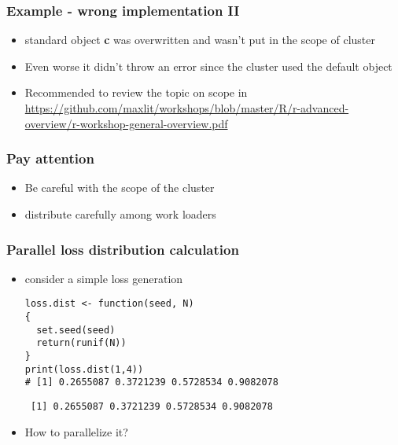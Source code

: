 \documentclass[bigger]{beamer}
\begin{document}
\begin{frame}
\frametitle{Example - wrong implementation II}
\label{sec-3-11}
\begin{itemize}

\item standard object \textbf{c} was overwritten and wasn't put in the scope of cluster
\label{sec-3-11-1}%

\item Even worse it didn't throw an error since the cluster used the default object
\label{sec-3-11-2}%

\item Recommended to review the topic on scope in\\
\label{sec-3-11-3}%
\href{https://github.com/maxlit/workshops/blob/master/R/r-advanced-overview/r-workshop-general-overview.pdf}{https://github.com/maxlit/workshops/blob/master/R/r-advanced-overview/r-workshop-general-overview.pdf}
\end{itemize} %
\end{frame}
\begin{frame}
\frametitle{Pay attention}
\label{sec-3-12}
\begin{itemize}

\item Be careful with the scope of the cluster
\label{sec-3-12-1}%

\item distribute carefully among work loaders
\label{sec-3-12-2}%
\end{itemize} %
\end{frame}
\begin{frame}[fragile]
\frametitle{Parallel loss distribution calculation}
\label{sec-3-13}
\begin{itemize}

\item consider a simple loss generation\\
\label{sec-3-13-1}%
\begin{verbatim}
loss.dist <- function(seed, N)
{
  set.seed(seed)
  return(runif(N))
}
print(loss.dist(1,4))
# [1] 0.2655087 0.3721239 0.5728534 0.9082078
\end{verbatim}

\begin{verbatim}
 [1] 0.2655087 0.3721239 0.5728534 0.9082078
\end{verbatim}


\item How to parallelize it?
\label{sec-3-13-2}%
\end{itemize} %
\end{frame}
\end{document}
